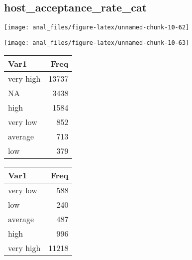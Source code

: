\centering

\hypertarget{host_acceptance_rate_cat}{%
\subsection{host\_acceptance\_rate\_cat}\label{host_acceptance_rate_cat}}

\begin{center}\texttt{[image: anal\_files/figure-latex/unnamed-chunk-10-62]} \end{center}

\begin{center}\texttt{[image: anal\_files/figure-latex/unnamed-chunk-10-63]} \end{center}

\begin{table}[H]
\centering
\begin{tabular}[t]{lr}
\toprule
Var1 & Freq\\
\midrule
very high & 13737\\
NA & 3438\\
high & 1584\\
very low & 852\\
average & 713\\
\addlinespace
low & 379\\
\bottomrule
\end{tabular}
\end{table}
\pagebreak

\begin{center}


\begin{tabular}[t]{lr}
\toprule
Var1 & Freq\\
\midrule
very low & 588\\
low & 240\\
average & 487\\
high & 996\\
very high & 11218\\
\bottomrule
\end{tabular}
\end{center}
